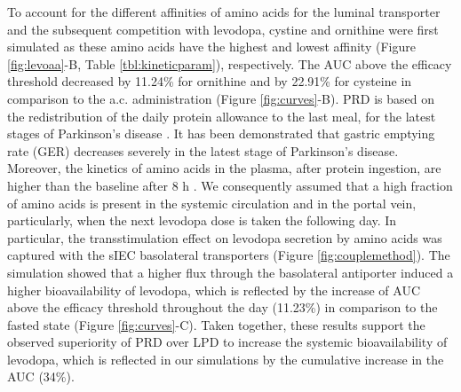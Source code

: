 To account for the different affinities of amino acids for the luminal transporter and the subsequent competition with levodopa, cystine and ornithine were first simulated as these amino acids have the highest and lowest affinity (Figure \ref{fig:levoaa}-B, Table \ref{tbl:kineticparam}), respectively. The AUC above the efficacy threshold
decreased by 11.24\% for ornithine and by 22.91\% for cysteine in comparison to the a.c. administration (Figure \ref{fig:curves}-B).
PRD is based on the redistribution of the daily protein allowance to the last meal, for the latest stages of Parkinson's disease \cite{cereda2010low}. It has been demonstrated that gastric emptying rate (GER) decreases severely in the latest stage of Parkinson's disease. Moreover, the
kinetics of amino acids in the plasma, after protein ingestion, are higher than the baseline after 8 h \cite{bos2003postprandial}. We consequently assumed that a high fraction of amino acids is present in the systemic circulation and in the portal vein, particularly, when the next levodopa dose is taken the following day. In particular, the transstimulation effect on levodopa secretion by amino acids was captured with the sIEC basolateral transporters (Figure \ref{fig:couplemethod}). The simulation showed that a higher flux through the basolateral antiporter induced a higher bioavailability of levodopa, which is reflected by the increase of AUC above the efficacy threshold throughout the day (11.23\%) in comparison to the fasted state
(Figure \ref{fig:curves}-C). Taken together, these results support the observed superiority of PRD over LPD to increase the systemic bioavailability of levodopa, which is reflected in our simulations by the cumulative increase in the AUC (34\%).
